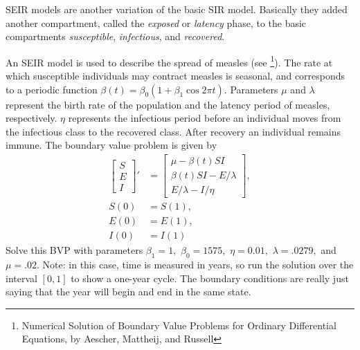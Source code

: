 \begin{problem}
SEIR models are another variation of the basic SIR model.
Basically they added another compartment, called the \emph{exposed} or \emph{latency} phase, to the basic compartments \emph{susceptible}, \emph{infectious}, and \emph{recovered}.

An SEIR model is used to describe the spread of measles (see \footnote{Numerical Solution of Boundary Value Problems for Ordinary Differential Equations, by Aescher, Mattheij, and Russell}).
The rate at which susceptible individuals may contract measles is seasonal, and corresponds to a periodic function $\beta(t) = \beta_0(1 + \beta_1 \cos{2\pi t})$.
Parameters $\mu$ and $\lambda$ represent the birth rate of the population and the latency period of measles, respectively.
$\eta$ represents the infectious period before an individual moves from the infectious class to the recovered class.
After recovery an individual remains immune.
The boundary value problem is given by
\begin{align*}
\left[\begin{array}{c}S \\ E \\ I\end{array}\right]' &= \left[\begin{array}{c}\mu - \beta(t) S I \\\beta(t) SI - E/\lambda \\E/\lambda - I/\eta\end{array}\right],\\
S(0) &= S(1),\\
E(0) &= E(1),\\
I(0) &= I(1)
\end{align*}
Solve this BVP with parameters $\beta_1 = 1,$ $\beta_0 = 1575,$ $\eta = 0.01,$ $\lambda = .0279,$ and $\mu = .02.$
Note: in this case, time is measured in years, so run the solution over the interval $\left[0, 1\right]$ to show a one-year cycle.
The boundary conditions are really just saying that the year will begin and end in the same state.


\end{problem}
